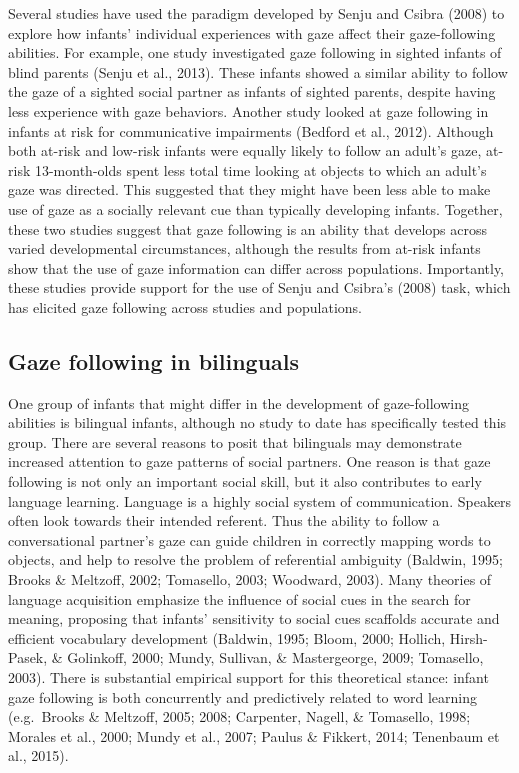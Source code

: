 \documentclass[,man,floatsintext]{apa6}
\begin{document}
Several studies have used the paradigm developed by Senju and Csibra (2008) to explore how infants' individual experiences with gaze affect their gaze-following abilities. For example, one study investigated gaze following in sighted infants of blind parents (Senju et al., 2013). These infants showed a similar ability to follow the gaze of a sighted social partner as infants of sighted parents, despite having less experience with gaze behaviors. Another study looked at gaze following in infants at risk for communicative impairments (Bedford et al., 2012). Although both at-risk and low-risk infants were equally likely to follow an adult's gaze, at-risk 13-month-olds spent less total time looking at objects to which an adult's gaze was directed. This suggested that they might have been less able to make use of gaze as a socially relevant cue than typically developing infants. Together, these two studies suggest that gaze following is an ability that develops across varied developmental circumstances, although the results from at-risk infants show that the use of gaze information can differ across populations. Importantly, these studies provide support for the use of Senju and Csibra's (2008) task, which has elicited gaze following across studies and populations.

\hypertarget{gaze-following-in-bilinguals}{%
\subsection{Gaze following in bilinguals}\label{gaze-following-in-bilinguals}}

One group of infants that might differ in the development of gaze-following abilities is bilingual infants, although no study to date has specifically tested this group. There are several reasons to posit that bilinguals may demonstrate increased attention to gaze patterns of social partners. One reason is that gaze following is not only an important social skill, but it also contributes to early language learning. Language is a highly social system of communication. Speakers often look towards their intended referent. Thus the ability to follow a conversational partner's gaze can guide children in correctly mapping words to objects, and help to resolve the problem of referential ambiguity (Baldwin, 1995; Brooks \& Meltzoff, 2002; Tomasello, 2003; Woodward, 2003). Many theories of language acquisition emphasize the influence of social cues in the search for meaning, proposing that infants' sensitivity to social cues scaffolds accurate and efficient vocabulary development (Baldwin, 1995; Bloom, 2000; Hollich, Hirsh-Pasek, \& Golinkoff, 2000; Mundy, Sullivan, \& Mastergeorge, 2009; Tomasello, 2003). There is substantial empirical support for this theoretical stance: infant gaze following is both concurrently and predictively related to word learning (e.g.~Brooks \& Meltzoff, 2005; 2008; Carpenter, Nagell, \& Tomasello, 1998; Morales et al., 2000; Mundy et al., 2007; Paulus \& Fikkert, 2014; Tenenbaum et al., 2015).
\end{document}
